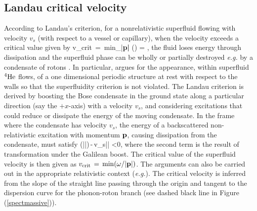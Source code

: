 \subsection{Landau critical velocity}
According to Landau's criterion, for a nonrelativistic superfluid flowing with velocity $v_s$ (with respect to a vessel or capillary), when the velocity exceeds a critical value \cite{Schmitt:2014eka} given by 
\be
v_{\rm crit} \,=\, {\rm min}_{|\bf p|} \left(\frac{\omega(\p)}{|\p|}\right)\,\implies \frac{\partial \omega}{\partial |\p|}\,=\,\frac{\omega}{|\p|}\,,
\ee
the fluid loses energy through dissipation and the superfluid phase can be wholly or partially destroyed \textit{e.g.} by a condensate of rotons \cite{pitaevskii84, voskresenskii93}. In particular, \cite{pitaevskii84} argues for the appearance, within superfluid ${}^4{\rm He}$ flows, of a one dimensional periodic structure at rest with  respect to the walls so that the superfluidity criterion is not violated. The Landau criterion is derived by boosting the Bose condensate in the ground state along a particular direction (say the $+x$-axis) with a velocity $v_s$, and considering excitations that could reduce or dissipate the energy of the moving condensate. In the frame where the condensate has velocity $v_s$, the energy of a backscattered non-relativistic excitation with momentum ${\bf p}$, causing dissipation  from the condensate, must  satisfy
\be
\omega(|\p|)\,-\,v_s|\p| <0,
\ee
where the second term is the result of  transformation under  the Galilean boost.
The critical value of the superfluid velocity is then given as $v_{\rm crit}\,=\,{\rm min}(\omega/|{\bf p}|)$. The arguments can also be carried out in the appropriate relativistic context (\textit{e.g.}\cite{voskresenskii93, Schmitt:2014eka}). The critical velocity is inferred from the slope of the straight line passing through the origin and tangent to the dispersion curve for the phonon-roton branch (see dashed black line in Figure (\ref{spectmassive})).

